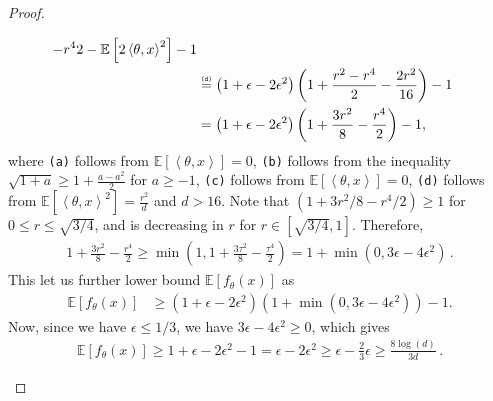 \documentclass[letter, 12pt]{report}
\newcommand{\explan}[1]{\stackrel{\text{\tiny \texttt{#1}}}}
\newcommand{\ip}[1]{\left \langle #1 \right \rangle}
\newcommand{\paren}[1]{\left( #1 \right)}
\newcommand{\brak}[1]{\left[ #1 \right]}
\newcommand{\E}{\mathbb E}
\newcommand{\1}{\mathbf{1}}
\theoremstyle{plain}
\theoremstyle{definition}
\theoremstyle{remark}
\begin{document}
\begin{proof}
\begin{enumcases}
\begin{align*}
{{                    -
                    r^4
                }{2}
                -
                \E\brak{
                    2\ip{\theta, x}^2
                }
            }
            - 1
            \\
             &
            \explan{(d)}
            =
            \paren{
                1 + \epsilon - 2\epsilon^2
            }
            \paren{
                1
                +
                \frac{
                    r^2
                    -
                    r^4
                }{2}
                -
                \frac{2r^2}{16}
            }
            - 1
            \\
             &
            =
            \paren{
                1 + \epsilon - 2\epsilon^2
            }
            \paren{
                1
                +
                \frac{3r^2}{8}
                -
                \frac{r^4}{2}
            }
            - 1,
        \end{align*}
        where \texttt{(a)} follows from
        $\E\brak{\ip{\theta, x}} = 0$,
        \texttt{(b)} follows from the inequality
        $\sqrt{1 + a} \geq 1 + \frac{a - a^2}{2}$ for $a \geq -1$,
        \texttt{(c)} follows from
        $\E\brak{\ip{\theta, x}} = 0$,
        \texttt{(d)} follows from
        $\E[\ip{\theta, x}^2] = \frac{r^2}{d}$
        and $d>16$.
        Note that $(1 + 3r^2/8 - r^4/2) \geq 1$
        for $0\leq r \leq \sqrt{3/4}$,
        and is decreasing in $r$
        for $r \in [\sqrt{3/4}, 1]$.
        Therefore,
        \begin{align*}
            1 + \frac{3r^2}{8} - \frac{r^4}{2}
            \geq
            \min(1, 1 + \frac{3\tau^2}{8} - \frac{\tau^4}{2})
            =
            1 + \min(0, 3\epsilon - 4\epsilon^2)
            \,.
        \end{align*}
        This let us further lower bound $\E[f_\theta(x)]$ as
        \begin{align*}
            \E\brak{
                f_\theta(x)
            }
             & \geq
            \paren{
                1 + \epsilon - 2\epsilon^2
            }
            \paren{
                1 + \min(0, 3\epsilon - 4\epsilon^2)
            }
            - 1.
        \end{align*}
        Now, since we have $\epsilon\leq1/3$, we have $3\epsilon - 4\epsilon^2 \geq 0$,
        which gives
        \begin{align*}
            \E\brak{
                f_\theta(x)
            }
            \geq
            1+ \epsilon - 2\epsilon^2 - 1
            =
            \epsilon - 2\epsilon^2
            \geq
            \epsilon - \frac23\epsilon
            \geq
            \frac{8\log(d)}{3d}
            \,.
        \end{align*}
    \end{enumcases}
\end{proof}
\end{document}
